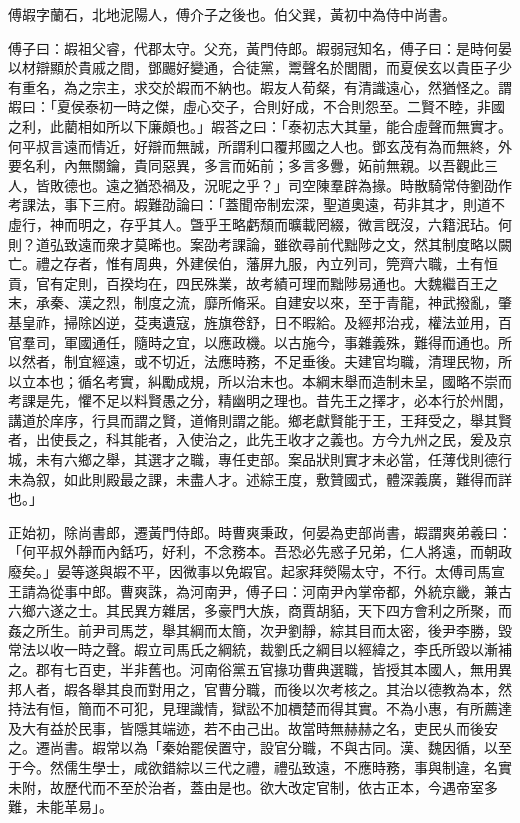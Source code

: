 
\begin{pinyinscope}
傅嘏字蘭石，北地泥陽人，傅介子之後也。伯父巽，黃初中為侍中尚書。

傅子曰：嘏祖父睿，代郡太守。父充，黃門侍郎。嘏弱冠知名，傅子曰：是時何晏以材辯顯於貴戚之間，鄧颺好變通，合徒黨，鬻聲名於閭閻，而夏侯玄以貴臣子少有重名，為之宗主，求交於嘏而不納也。嘏友人荀粲，有清識遠心，然猶怪之。謂嘏曰：「夏侯泰初一時之傑，虛心交子，合則好成，不合則怨至。二賢不睦，非國之利，此藺相如所以下廉頗也。」嘏荅之曰：「泰初志大其量，能合虛聲而無實才。何平叔言遠而情近，好辯而無誠，所謂利口覆邦國之人也。鄧玄茂有為而無終，外要名利，內無關鑰，貴同惡異，多言而妬前；多言多釁，妬前無親。以吾觀此三人，皆敗德也。遠之猶恐禍及，況昵之乎？」司空陳羣辟為掾。時散騎常侍劉劭作考課法，事下三府。嘏難劭論曰：「蓋聞帝制宏深，聖道奧遠，苟非其才，則道不虛行，神而明之，存乎其人。曁乎王略虧頹而曠載罔綴，微言旣沒，六籍泯玷。何則？道弘致遠而衆才莫晞也。案劭考課論，雖欲尋前代黜陟之文，然其制度略以闕亡。禮之存者，惟有周典，外建侯伯，藩屏九服，內立列司，筦齊六職，土有恒貢，官有定則，百揆均在，四民殊業，故考績可理而黜陟易通也。大魏繼百王之末，承秦、漢之烈，制度之流，靡所脩采。自建安以來，至于青龍，神武撥亂，肇基皇祚，掃除凶逆，芟夷遺寇，旌旗卷舒，日不暇給。及經邦治戎，權法並用，百官羣司，軍國通任，隨時之宜，以應政機。以古施今，事雜義殊，難得而通也。所以然者，制宜經遠，或不切近，法應時務，不足垂後。夫建官均職，清理民物，所以立本也；循名考實，糾勵成規，所以治末也。本綱末舉而造制未呈，國略不崇而考課是先，懼不足以料賢愚之分，精幽明之理也。昔先王之擇才，必本行於州閭，講道於庠序，行具而謂之賢，道脩則謂之能。鄉老獻賢能于王，王拜受之，舉其賢者，出使長之，科其能者，入使治之，此先王收才之義也。方今九州之民，爰及京城，未有六鄉之舉，其選才之職，專任吏部。案品狀則實才未必當，任薄伐則德行未為叙，如此則殿最之課，未盡人才。述綜王度，敷贊國式，體深義廣，難得而詳也。」

正始初，除尚書郎，遷黃門侍郎。時曹爽秉政，何晏為吏部尚書，嘏謂爽弟羲曰：「何平叔外靜而內銛巧，好利，不念務本。吾恐必先惑子兄弟，仁人將遠，而朝政廢矣。」晏等遂與嘏不平，因微事以免嘏官。起家拜熒陽太守，不行。太傅司馬宣王請為從事中郎。曹爽誅，為河南尹，傅子曰：河南尹內掌帝都，外統京畿，兼古六鄉六遂之士。其民異方雜居，多豪門大族，商賈胡貊，天下四方會利之所聚，而姦之所生。前尹司馬芝，舉其綱而太簡，次尹劉靜，綜其目而太密，後尹李勝，毀常法以收一時之聲。嘏立司馬氏之綱統，裁劉氏之綱目以經緯之，李氏所毀以漸補之。郡有七百吏，半非舊也。河南俗黨五官掾功曹典選職，皆授其本國人，無用異邦人者，嘏各舉其良而對用之，官曹分職，而後以次考核之。其治以德教為本，然持法有恒，簡而不可犯，見理識情，獄訟不加檟楚而得其實。不為小惠，有所薦達及大有益於民事，皆隱其端迹，若不由己出。故當時無赫赫之名，吏民乆而後安之。遷尚書。嘏常以為「秦始罷侯置守，設官分職，不與古同。漢、魏因循，以至于今。然儒生學士，咸欲錯綜以三代之禮，禮弘致遠，不應時務，事與制違，名實未附，故歷代而不至於治者，蓋由是也。欲大改定官制，依古正本，今遇帝室多難，未能革易」。


\end{pinyinscope}
